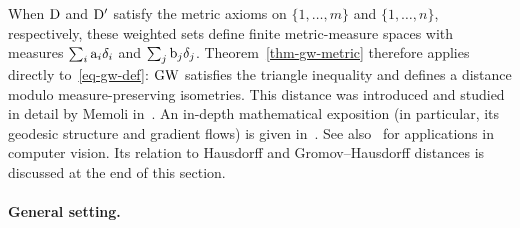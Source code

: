 When $\mathrm{D}$ and $\mathrm{D}'$ satisfy the metric axioms on $\{1,\ldots,m\}$ and $\{1,\ldots,n\}$, respectively, these weighted sets define finite metric-measure spaces with measures $\sum_i\mathrm{a}_i\delta_i$ and $\sum_j\mathrm{b}_j\delta_j$. Theorem~\ref{thm-gw-metric} therefore applies directly to~\eqref{eq-gw-def}: $\operatorname{\mathrm{GW}}$ satisfies the triangle inequality and defines a distance modulo measure-preserving isometries.
%
This distance was introduced and studied in detail by Memoli in~\cite{memoli-2011}. An in-depth mathematical exposition (in particular, its geodesic structure and gradient flows) is given in~\cite{SturmGW}. See also~\cite{schmitzer2013modelling} for applications in computer vision.
%
Its relation to Hausdorff and Gromov--Hausdorff distances is discussed at the end of this section.

\paragraph{General setting.}

